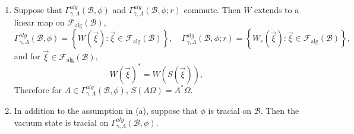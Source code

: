 \documentclass[10pt,a4paper]{amsart}
\newcommand{\mc}[1]{\mathcal{#1}}
\newcommand{\set}[1]{\left\{#1\right\}}
\begin{document}
\begin{Prop}
\label{Prop:Interacting-traciality}
\

\begin{enumerate}
\item
Suppose that $\Gamma^{alg}_{\gamma, \Lambda}(\mc{B}, \phi)$ and $\Gamma^{alg}_{\gamma, \Lambda}(\mc{B}, \phi; r)$ commute. Then $W$ extends to a linear map on $\mc{F}_{\text{alg}}(\mc{B})$,
\[
\Gamma^{alg}_{\gamma, \Lambda}(\mc{B}, \phi) = \set{W(\vec{\xi}) : \vec{\xi} \in \mc{F}_{\text{alg}}(\mc{B})}, \quad \Gamma^{alg}_{\gamma, \Lambda}(\mc{B}, \phi; r) = \set{W_r(\vec{\xi}) : \vec{\xi} \in \mc{F}_{\text{alg}}(\mc{B})},
\]
and for $\vec{\xi} \in \mc{F}_{\text{alg}}(\mc{B})$,
\[
W(\vec{\xi})^\ast = W(S(\vec{\xi})),
\]
Therefore for $A \in \Gamma^{alg}_{\gamma, \Lambda}(\mc{B}, \phi)$, $S(A \Omega) = A^\ast \Omega$.
\item
In addition to the assumption in (a), suppose that $\phi$ is tracial on $\mc{B}$. Then the vacuum state is tracial on $\Gamma^{alg}_{\gamma, \Lambda}(\mc{B}, \phi)$.
\end{enumerate}
\end{Prop}
\end{document}
